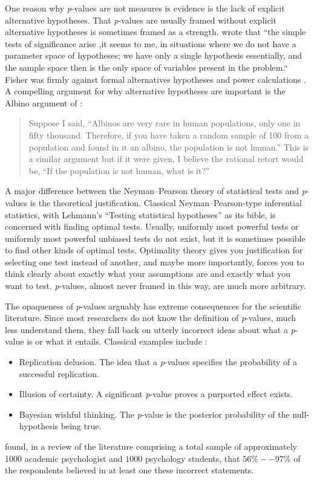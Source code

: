 One reason why \emph{p}-values are not measures is evidence is the lack of explicit alternative hypotheses. That \emph{p}-values are usually framed without explicit alternative hypotheses is sometimes framed as a strength. \textcite[p. 308]{Barnard1962-rz} wrote that ``the simple tests of significance arise ,it seems to me, in situations where we do not have a parameter space of hypotheses; we have only a single hypothesis essentially, and the sample space then is the only space of variables present in the problem.`` Fisher was firmly against formal alternatives hypotheses and power calculations \parencite{Lehmann1993-oa}. A compelling argument for why alternative hypotheses are important is the Albino argument of \textcite{Berkson1942-hj}:
\begin{quotation}
Suppose I said, \textquotedblleft Albinos are very rare in human populations, only one in fifty thousand. Therefore, if you have taken a random sample of 100 from a population and found in it an albino, the population is not human.\textquotedblright{} This is a similar argument but if it were given, I believe the rational retort would be, \textquotedblleft If the population is not human, what is it?\textquotedblright{} 
\end{quotation}
A major difference between the Neyman--Pearson theory of statistical tests and \textit{p}-values is the theoretical justification. Classical Neyman--Pearson-type inferential statistics, with Lehmann's ``Testing statistical hypotheses'' \parencite{Lehmann2005-sp} as its bible, is concerned with finding optimal tests. Usually, uniformly most powerful tests or uniformly most powerful unbiased tests do not exist, but it is sometimes possible to find other kinds of optimal tests. Optimality theory gives you justification for selecting one test instead of another, and maybe more importantly, forces you to think clearly about exactly what your assumptions are and exactly what you want to test. \emph{p}-values, almost never framed in this way, are much more arbitrary. 

The opaqueness of \textit{p}-values arguably has extreme consequences for the scientific literature. Since most researchers do not know the definition of \textit{p}-values, much less understand them, they fall back on utterly incorrect ideas about what a \textit{p}-value is or what it entails. Classical examples include \parencite{Gigerenzer2018-oi}:
\begin{itemize}
    \item Replication delusion. The idea that a  \textit{p}-values specifies the probability of a successful replication.
    \item Illusion of certainty. A significant \textit{p}-value proves a purported effect exists.
    \item Bayesian wishful thinking. The \textit{p}-value is the posterior probability of the null-hypothesis being true.
\end{itemize}
\textcite{Gigerenzer2018-oi} found, in a review of the literature comprising a total sample of approximately 1000 academic psychologist and $1000$ psychology students, that $56\%--97\%$ of the respondents believed in at least one these incorrect statements. 

